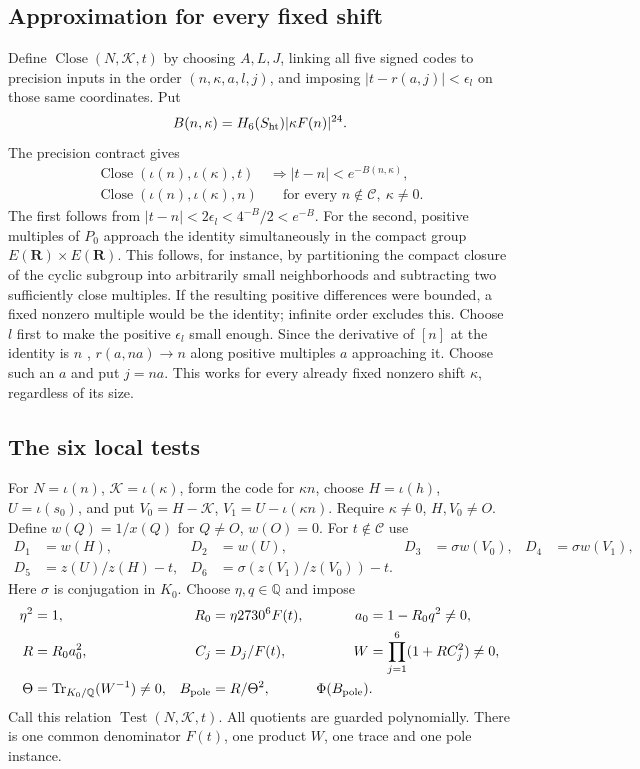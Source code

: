 \documentclass[11pt]{article}
\theoremstyle{definition}
\theoremstyle{remark}
\newcommand{\Q}{\mathbb Q}
\newcommand{\Cset}{\mathcal C}
\newcommand{\Tr}{\operatorname{Tr}}
\newcommand{\Close}{\operatorname{Close}}
\newcommand{\Test}{\operatorname{Test}}
\begin{document}
\subsection{Approximation for every fixed shift}
Define $\Close(N,\mathcal K,t)$ by choosing $A,L,J$, linking all five
signed codes to precision inputs in the order $(n,\kappa,a,l,j)$, and
imposing $|t-r(a,j)|<\epsilon_l$ on those same coordinates. Put
\[
 B(n,\kappa)=H_6(S_{\rm ht})|\kappa F(n)|^{24}.
\]
The precision contract gives
\begin{align}
 \Close(\iota(n),\iota(\kappa),t)&\Longrightarrow
                  |t-n|<e^{-B(n,\kappa)},\label{eq:close-sound}\\
 \Close(\iota(n),\iota(\kappa),n)&\quad\text{for every }
                  n\notin\Cset,\ \kappa\ne0.\label{eq:close-complete}
\end{align}
The first follows from $|t-n|<2\epsilon_l<4^{-B}/2<e^{-B}$.
For the second, positive multiples of $P_0$ approach the identity
simultaneously in the compact group $E(\mathbf R)\times E(\mathbf R)$.
This follows, for instance, by partitioning the compact closure of the
cyclic subgroup into arbitrarily small neighborhoods and subtracting
two sufficiently close multiples. If the resulting positive differences
were bounded, a fixed nonzero multiple would be the identity; infinite
order excludes this. Choose $l$ first to make the positive $\epsilon_l$
small enough. Since the derivative of $[n]$ at the identity is $n$
\cite[IV.2.3(a), p.~122]{silverman},
$r(a,na)\to n$ along positive multiples $a$ approaching it. Choose such
an $a$ and put $j=na$. This works for every already fixed nonzero shift
$\kappa$, regardless of its size.

\subsection{The six local tests}
For $N=\iota(n)$, $\mathcal K=\iota(\kappa)$, form the code for
$\kappa n$, choose $H=\iota(h)$, $U=\iota(s_0)$, and put
$V_0=H-\mathcal K$, $V_1=U-\iota(\kappa n)$.
Require $\kappa\ne0$, $H,V_0\ne O$. Define $w(Q)=1/x(Q)$ for
$Q\ne O$, $w(O)=0$. For $t\notin\Cset$ use
\begin{align*}
 D_1&=w(H),&D_2&=w(U),&D_3&=\sigma w(V_0),&D_4&=\sigma w(V_1),\\
 D_5&=z(U)/z(H)-t,&D_6&=\sigma(z(V_1)/z(V_0))-t.
\end{align*}
Here $\sigma$ is conjugation in $K_0$. Choose $\eta,q\in\Q$ and impose
\begin{align*}
 \eta^2&=1,&R_0&=\eta2730^6F(t),&a_0&=1-R_0q^2\ne0,\\
 R&=R_0a_0^2,&C_j&=D_j/F(t),&W&=\prod_{j=1}^6(1+RC_j^2)\ne0,\\
 \Theta&=\Tr_{K_0/\Q}(W^{-1})\ne0,&B_{\rm pole}&=R/\Theta^2,
 &\Phi(B_{\rm pole})&.
\end{align*}
Call this relation $\Test(N,\mathcal K,t)$. All quotients are guarded
polynomially. There is one common denominator $F(t)$, one product $W$,
one trace and one pole instance.
\end{document}
